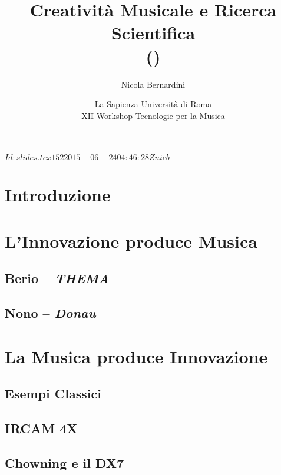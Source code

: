 \documentclass[compress]{beamer}
\title[Creativit\`a Musicale e Ricerca Scientifica]
{%
    Creativit\`a Musicale e Ricerca Scientifica\\
	{\tiny (\rcstag)}
}
\author{%
	Nicola Bernardini\\
    \href{mailto:\cpholderemail}{\cpholderemail}
}
\institute[SMERM]%
{%
	\href{http://www.conservatoriosantacecilia.it}
		 {Conservatorio di Musica ``S.Cecilia'' -- Roma}
}
\date[Roma, 24/06/2015]{La Sapienza Universit\`a di Roma\\XII Workshop Tecnologie per la Musica}
\begin{document}
\svnInfo $Id: slides.tex 152 2015-06-24 04:46:28Z nicb $
  
\begin{frame}
	\titlepage
\end{frame}



\section{Introduzione}



\section[Innovazione $\Rightarrow$ Musica]{L'Innovazione produce Musica}

\subsection{Berio -- {\it THEMA}}



\subsection{Nono -- {\it Donau}}



\section[Musica $\Rightarrow$ Innovazione]{La Musica produce Innovazione}

\subsection[Classici]{Esempi Classici}



\subsection[4X]{IRCAM 4X}



\subsection[DX7]{Chowning e il DX7}
\end{document}
